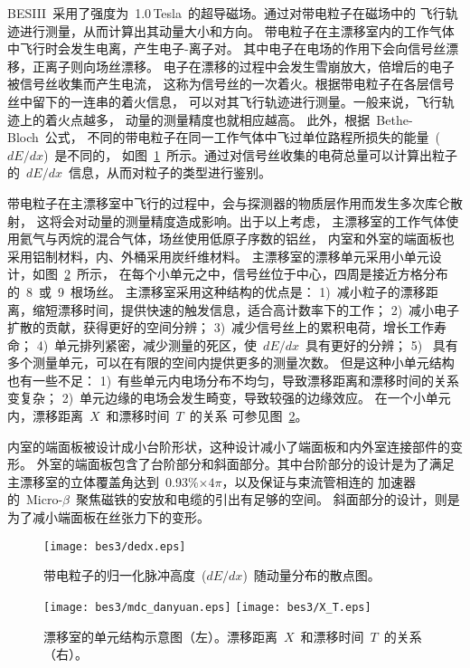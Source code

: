 BESIII~采用了强度为~1.0\,Tesla~的超导磁场。通过对带电粒子在磁场中的
飞行轨迹进行测量，从而计算出其动量大小和方向。
带电粒子在主漂移室内的工作气体中飞行时会发生电离，产生电子-离子对。
其中电子在电场的作用下会向信号丝漂移，正离子则向场丝漂移。
电子在漂移的过程中会发生雪崩放大，倍增后的电子被信号丝收集而产生电流，
这称为信号丝的一次着火。根据带电粒子在各层信号丝中留下的一连串的着火信息，
可以对其飞行轨迹进行测量。一般来说，飞行轨迹上的着火点越多，
动量的测量精度也就相应越高。 此外，根据~Bethe-Bloch~公式，
不同的带电粒子在同一工作气体中飞过单位路程所损失的能量~($dE/dx$)~是不同的，
如图~\ref{fig:dedx}~所示。通过对信号丝收集的电荷总量可以计算出粒子
的~$dE/dx$~信息，从而对粒子的类型进行鉴别。

带电粒子在主漂移室中飞行的过程中，会与探测器的物质层作用而发生多次库仑散射，
这将会对动量的测量精度造成影响。出于以上考虑，
主漂移室的工作气体使用氦气与丙烷的混合气体，场丝使用低原子序数的铝丝，
内室和外室的端面板也采用铝制材料，内、外桶采用炭纤维材料。
主漂移室的漂移单元采用小单元设计，如图~\ref{fig:mdc_danyuan_XT}~所示，
在每个小单元之中，信号丝位于中心，四周是接近方格分布的~8~或~9~根场丝。
主漂移室采用这种结构的优点是：
1)~减小粒子的漂移距离，缩短漂移时间，提供快速的触发信息，适合高计数率下的工作；
2)~减小电子扩散的贡献，获得更好的空间分辨；
3)~减少信号丝上的累积电荷，增长工作寿命；
4)~单元排列紧密，减少测量的死区，使~$dE/dx$~具有更好的分辨；
5)~ 具有多个测量单元，可以在有限的空间内提供更多的测量次数。
但是这种小单元结构也有一些不足：
1)~有些单元内电场分布不均匀，导致漂移距离和漂移时间的关系变复杂；
2)~单元边缘的电场会发生畸变，导致较强的边缘效应。
在一个小单元内，漂移距离~$X$~和漂移时间~$T$~的关系
可参见图~\ref{fig:mdc_danyuan_XT}。

内室的端面板被设计成小台阶形状，这种设计减小了端面板和内外室连接部件的变形。
外室的端面板包含了台阶部分和斜面部分。其中台阶部分的设计是为了满足
主漂移室的立体覆盖角达到~0.93\%$\times4\pi$，以及保证与束流管相连的
加速器的~Micro-$\beta$~聚焦磁铁的安放和电缆的引出有足够的空间。
斜面部分的设计，则是为了减小端面板在丝张力下的变形。
\begin{figure}
\begin{center}
 \texttt{[image: bes3/dedx.eps]}
 \caption{带电粒子的归一化脉冲高度~($dE/dx$)~随动量分布的散点图。}
 \label{fig:dedx}
 \end{center}
\end{figure}

\begin{figure}
\texttt{[image: bes3/mdc\_danyuan.eps]}
\texttt{[image: bes3/X\_T.eps]}
\caption{漂移室的单元结构示意图（左）。漂移距离~$X$~和漂移时间~$T$~的关系（右）。}
\label{fig:mdc_danyuan_XT}
\end{figure}


